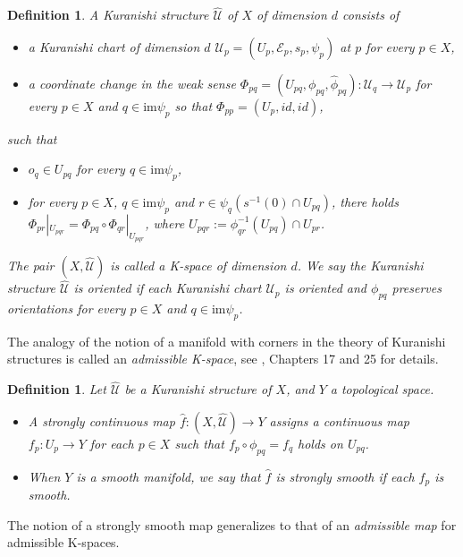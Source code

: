 \documentclass[a4paper]{article}
\newtheorem{definition}[theorem]{Definition}
\numberwithin{equation}{section}
\begin{document}
\begin{definition}\label{definition:K-structure}
A Kuranishi structure $\widehat{\mathcal{U}}$ of $X$ of dimension $d$ consists of
	\begin{itemize}
		\item a Kuranishi chart of dimension $d$ $\mathcal{U}_p=(U_p,\mathcal{E}_p,s_p,\psi_p)$ at $p$ for every $p\in X$,
		\item a coordinate change in the weak sense $\Phi_{pq}=(U_{pq},\phi_{pq},\hat{\phi}_{pq}):\mathcal{U}_q\rightarrow\mathcal{U}_p$ for every $p\in X$ and $q\in\mathrm{im}\psi_p$ so that $\Phi_{pp}=(U_p,\mathit{id},\mathit{id})$,
	\end{itemize}
such that
	\begin{itemize}
		\item[(i)] $o_q\in U_{pq}$ for every $q\in\mathrm{im}\psi_p$,
		\item[(ii)] for every $p\in X$, $q\in\mathrm{im}\psi_p$ and $r\in\psi_q\left(s^{-1}(0)\cap U_{pq}\right)$, there holds $\Phi_{pr}|_{U_{pqr}}=\Phi_{pq}\circ\Phi_{qr}|_{U_{pqr}}$, where $U_{pqr}:=\phi_{qr}^{-1}(U_{pq})\cap U_{pr}$.
	\end{itemize}
The pair $(X,\widehat{\mathcal{U}})$ is called a K-space of dimension $d$. We say the Kuranishi structure $\widehat{\mathcal{U}}$ is oriented if each Kuranishi chart $\mathcal{U}_p$ is oriented and $\phi_{pq}$ preserves orientations for every $p\in X$ and $q\in\mathrm{im}\psi_p$.
\end{definition}

The analogy of the notion of a manifold with corners in the theory of Kuranishi structures is called an \textit{admissible K-space}, see \cite{fooo4}, Chapters 17 and 25 for details.

\begin{definition}
Let $\widehat{\mathcal{U}}$ be a Kuranishi structure of $X$, and $Y$ a topological space.
\begin{itemize}
	\item[(i)] A strongly continuous map $\hat{f}:(X,\widehat{\mathcal{U}})\rightarrow Y$ assigns a continuous map $f_p:U_p\rightarrow Y$ for each $p\in X$ such that $f_p\circ\phi_{pq}=f_q$ holds on $U_{pq}$.
	\item[(ii)] When $Y$ is a smooth manifold, we say that $\hat{f}$ is strongly smooth if each $f_p$ is smooth.
\end{itemize}
\end{definition}

The notion of a strongly smooth map generalizes to that of an \textit{admissible map} for admissible K-spaces.
\end{document}
